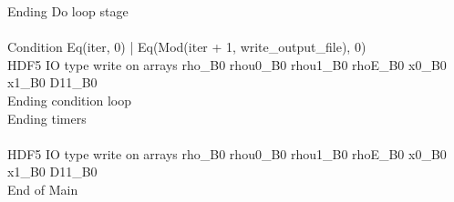 \documentclass{article}
\begin{document}
\noindent Ending Do loop stage\\
\\\noindent Condition Eq(iter, 0) | Eq(Mod(iter + 1, write_output_file), 0)\\\noindent HDF5 IO type write on arrays rho_B0 rhou0_B0 rhou1_B0 rhoE_B0 x0_B0 x1_B0 D11_B0\\\noindent Ending condition loop %
\\\noindent Ending timers\\
\\\noindent HDF5 IO type write on arrays rho_B0 rhou0_B0 rhou1_B0 rhoE_B0 x0_B0 x1_B0 D11_B0\\\noindent End of Main\\
\end{document}

